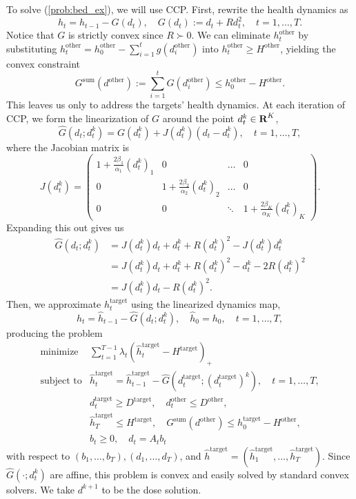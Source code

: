 \documentclass[12pt]{article}
\begin{document}
To solve (\ref{prob:bed_ex}), we will use CCP. First, rewrite the health dynamics as
\[
	h_t = h_{t-1} - G(d_t), \quad G(d_t) := d_t + Rd_t^2, \quad t = 1,\ldots,T.
\]
Notice that $G$ is strictly convex since $R \succ 0$. We can eliminate $h_t^{\text{other}}$ by substituting $h_t^{\text{other}} = h_0^{\text{other}} - \sum_{i=1}^t g(d_i^{\text{other}})$ into $h_t^{\text{other}} \geq H^{\text{other}}$, yielding the convex constraint
\[
	G^{\text{sum}}(d^{\text{other}}) := \sum_{i=1}^t G(d_i^{\text{other}}) \leq h_0^{\text{other}} - H^{\text{other}}.
\]
This leaves us only to address the targets' health dynamics. At each iteration of CCP, we form the linearization of $G$ around the point $d_t^k \in {\mbox{\bf R}}^K$,
\[
	\hat G(d_t;d_t^k) = G(d_t^k) + J(d_t^k)(d_t - d_t^k), \quad t = 1,\ldots,T,
\]
where the Jacobian matrix is
\[
	J(d_t^k) %
	= \left(\begin{array}{cccc}
		1 + \frac{2\beta_1}{\alpha_1} (d_t^k)_1 & 0 & \ldots & 0 \\
		0 & 1 + \frac{2\beta_2}{\alpha_2} (d_t^k)_2 & \ldots & 0 \\
		0 & 0 & \ddots & 1 + \frac{2\beta_K}{\alpha_K} (d_t^k)_K
	\end{array}\right).
\]
Expanding this out gives us
\begin{align*}
	\hat G(d_t;d_t^k) &= J(d_t^k)d_t + d_t^k + R(d_t^k)^2 - J(d_t^k)d_t^k \\
	&= J(d_t^k)d_t + d_t^k + R(d_t^k)^2 - d_t^k - 2R(d_t^k)^2 \\
	&= J(d_t^k)d_t - R(d_t^k)^2.
\end{align*}
Then, we approximate $h_t^{\text{target}}$ using the linearized dynamics map, 
\[
	\hat h_t = \hat h_{t-1} - \hat G(d_t;d_t^k), \quad \hat h_0 = h_0, \quad t = 1,\ldots,T,
\]
producing the problem
\[
\begin{array}{ll}
	\mbox{minimize} & \sum_{t=1}^{T-1} \lambda_t(\hat h_t^{\text{target}} - H^{\text{target}})_+ \\
	\mbox{subject to} & \hat h_t^{\text{target}} = \hat h_{t-1}^{\text{target}} - \hat G(d_t^{\text{target}};(d_t^{\text{target}})^k), \quad t = 1,\ldots,T, \\
	& d_t^{\text{target}} \geq D^{\text{target}}, \quad d_t^{\text{other}} \leq D^{\text{other}}, \\
	& \hat h_T^{\text{target}} \leq H^{\text{target}}, \quad G^{\text{sum}}(d^{\text{other}}) \leq h_0^{\text{target}} - H^{\text{other}}, \\
	& b_t \geq 0, \quad d_t = A_tb_t
\end{array}
\]
with respect to $(b_1,\ldots,b_T), (d_1,\ldots,d_T)$, and $\hat h^{\text{target}} = (\hat h_1^{\text{target}},\ldots,\hat h_T^{\text{target}})$. Since $\hat G(\cdot;d_t^k)$ are affine, this problem is convex and easily solved by standard convex solvers. We take %
$d^{k+1}$ to be the dose solution.
\end{document}

